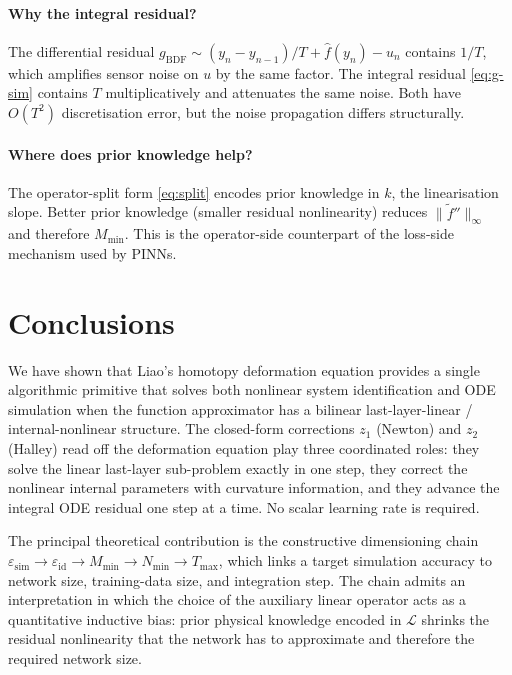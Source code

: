 \documentclass[preprint,12pt,numbers]{elsarticle}
\begin{document}
\paragraph{Why the integral residual?} The differential residual
$g_{\mathrm{BDF}} \sim (y_n - y_{n-1})/T + \hat{f}(y_n) - u_n$ contains
$1/T$, which amplifies sensor noise on $u$ by the same factor. The
integral residual \eqref{eq:g-sim} contains $T$ multiplicatively and
attenuates the same noise. Both have $O(T^2)$ discretisation error, but
the noise propagation differs structurally.

\paragraph{Where does prior knowledge help?} The operator-split form
\eqref{eq:split} encodes prior knowledge in $k$, the linearisation
slope. Better prior knowledge (smaller residual nonlinearity) reduces
$\|\tilde{f}''\|_\infty$ and therefore $M_{\min}$. This is the
operator-side counterpart of the loss-side mechanism used by PINNs.


\section{Conclusions}
\label{sec:conclusions}

We have shown that Liao's homotopy deformation equation provides a
single algorithmic primitive that solves both nonlinear system
identification and ODE simulation when the function approximator has a
bilinear last-layer-linear / internal-nonlinear structure. The closed-form
corrections $z_1$ (Newton) and $z_2$ (Halley) read off the deformation
equation play three coordinated roles: they solve the linear last-layer
sub-problem exactly in one step, they correct the nonlinear internal
parameters with curvature information, and they advance the integral
ODE residual one step at a time. No scalar learning rate is required.

The principal theoretical contribution is the constructive dimensioning
chain
$\varepsilon_{\mathrm{sim}} \to \varepsilon_{\mathrm{id}} \to M_{\min} \to N_{\min} \to T_{\max}$,
which links a target simulation accuracy to network size, training-data
size, and integration step. The chain admits an interpretation in which
the choice of the auxiliary linear operator acts as a quantitative
inductive bias: prior physical knowledge encoded in $\mathcal{L}$
shrinks the residual nonlinearity that the network has to approximate
and therefore the required network size.
\end{document}

